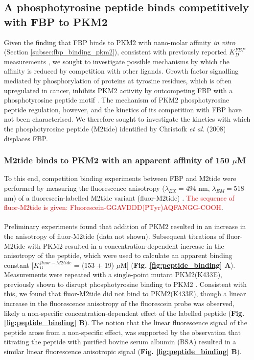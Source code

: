 \subsection{A phosphotyrosine peptide binds competitively with FBP to PKM2} \label{A phosphotyrosine peptide binds competitively with FBP to PKM2}
Given the finding that FBP binds to PKM2 with nano-molar affinity \textit{in vitro} (Section \ref{subsec:fbp_binding_pkm2}), consistent with previously reported $K_{D}^{FBP}$ measurements \cite{Gavriilidou:2018aa,Ikeda:1998aa,Yan:2016aa}, we sought to investigate possible mechanisms by which the affinity is reduced by competition with other ligands. Growth factor signalling mediated by phosphorylation of proteins at tyrosine residues, which is often upregulated in cancer, inhibits PKM2 activity by outcompeting FBP with a phosphotyrosine peptide motif \cite{Christofk:2008aa}. The mechanism of PKM2 phosphotyrosine peptide regulation, however, and the kinetics of its competition with FBP have not been characterised. We therefore sought to investigate the kinetics with which the phosphotyrosine peptide (M2tide) identified by Christofk \textit{et al.} (2008) \cite{Christofk:2008aa} displaces FBP.

\subsubsection{M2tide binds to PKM2 with an apparent affinity of 150 $\mu$M}
To this end, competition binding experiments between FBP and M2tide were performed by measuring the fluorescence anisotropy ($\lambda_{EX} = 494$ nm,  $\lambda_{EM} = 518$ nm) of a fluorescein-labelled M2tide variant (fluor-M2tide) \cite{Allali-Hassani:2009aa,Gao:2013aa}. \textcolor{red}{The sequence of fluor-M2tide is given: Fluorescein-GGAVDDD(PTyr)AQFANGG-COOH}.
%
%
\\\\
%
%
Preliminary experiments found that addition of PKM2 resulted in an increase in the anisotropy of fluor-M2tide (data not shown). Subsequent titrations of fluor-M2tide with PKM2 resulted in a concentration-dependent increase in the anisotropy of the peptide, which were used to calculate an apparent binding constant [$K_{D}^{fluor-M2tide}$ = (153 $\pm$ 19) $\mu$M] (\textbf{Fig. \ref{fig:peptide_binding} A}). Measurements were repeated with a single-point mutant PKM2(K433E), previously shown to disrupt phosphotyrosine binding to PKM2 \cite{Christofk:2008aa}. Consistent with this, we found that fluor-M2tide did not bind to PKM2(K433E), though a linear increase in the fluorescence anisotropy of the fluorescein probe was observed, likely a non-specific concentration-dependent effect of the labelled peptide (\textbf{Fig. \ref{fig:peptide_binding} B}). The notion that the linear fluorescence signal of the peptide arose from a non-specific effect, was supported by the observation that titrating the peptide with purified bovine serum albumin (BSA) resulted in a similar linear fluorescence anisotropic signal (\textbf{Fig. \ref{fig:peptide_binding} B}).

